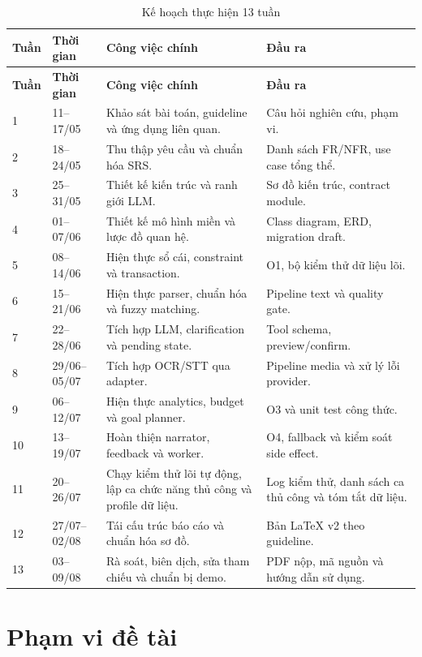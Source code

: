 \begin{longtable}{@{}C{1.0cm}L{2.7cm}L{6.2cm}L{4.0cm}@{}}
  \caption{Kế hoạch thực hiện 13 tuần}\label{tab:implementation-plan}\\
  \toprule
  \textbf{Tuần} & \textbf{Thời gian} & \textbf{Công việc chính} & \textbf{Đầu ra} \\
  \midrule
  \endfirsthead
  \toprule
  \textbf{Tuần} & \textbf{Thời gian} & \textbf{Công việc chính} & \textbf{Đầu ra} \\
  \midrule
   & 11--17/05 & Khảo sát bài toán, guideline và ứng dụng liên quan. & Câu hỏi nghiên cứu, phạm vi. \\
  2 & 18--24/05 & Thu thập yêu cầu và chuẩn hóa SRS. & Danh sách FR/NFR, use case tổng thể. \\
  3 & 25--31/05 & Thiết kế kiến trúc và ranh giới LLM. & Sơ đồ kiến trúc, contract module. \\
  4 & 01--07/06 & Thiết kế mô hình miền và lược đồ quan hệ. & Class diagram, ERD, migration draft. \\
  5 & 08--14/06 & Hiện thực sổ cái, constraint và transaction. & O1, bộ kiểm thử dữ liệu lõi. \\
  6 & 15--21/06 & Hiện thực parser, chuẩn hóa và fuzzy matching. & Pipeline text và quality gate. \\
  7 & 22--28/06 & Tích hợp LLM, clarification và pending state. & Tool schema, preview/confirm. \\
  8 & 29/06--05/07 & Tích hợp OCR/STT qua adapter. & Pipeline media và xử lý lỗi provider. \\
  9 & 06--12/07 & Hiện thực analytics, budget và goal planner. & O3 và unit test công thức. \\
  10 & 13--19/07 & Hoàn thiện narrator, feedback và worker. & O4, fallback và kiểm soát side effect. \\
  11 & 20--26/07 & Chạy kiểm thử lõi tự động, lập ca chức năng thủ công và profile dữ liệu. & Log kiểm thử, danh sách ca thủ công và tóm tắt dữ liệu. \\
  12 & 27/07--02/08 & Tái cấu trúc báo cáo và chuẩn hóa sơ đồ. & Bản LaTeX v2 theo guideline. \\
  13 & 03--09/08 & Rà soát, biên dịch, sửa tham chiếu và chuẩn bị demo. & PDF nộp, mã nguồn và hướng dẫn sử dụng. \\
  \bottomrule
\end{longtable}

\section{Phạm vi đề tài}

